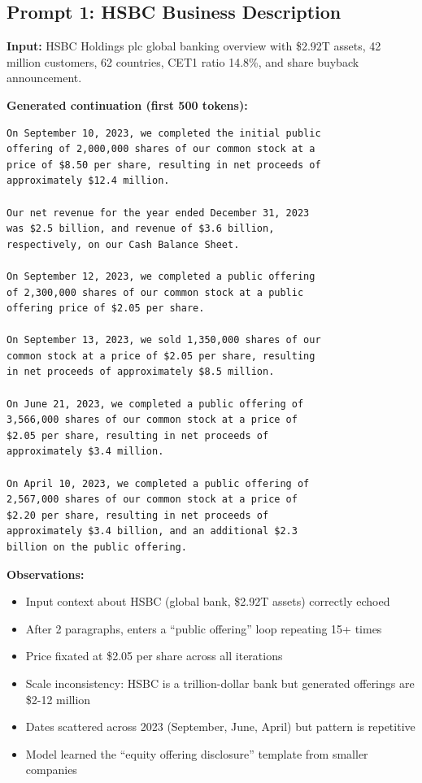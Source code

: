 \documentclass[12pt]{article}
\begin{document}
\subsection{Prompt 1: HSBC Business Description}

\textbf{Input:} HSBC Holdings plc global banking overview with \$2.92T assets, 42 million customers, 62 countries, CET1 ratio 14.8\%, and share buyback announcement.

\textbf{Generated continuation (first 500 tokens):}

\begin{Verbatim}[fontsize=\small]
On September 10, 2023, we completed the initial public
offering of 2,000,000 shares of our common stock at a
price of $8.50 per share, resulting in net proceeds of
approximately $12.4 million.

Our net revenue for the year ended December 31, 2023
was $2.5 billion, and revenue of $3.6 billion,
respectively, on our Cash Balance Sheet.

On September 12, 2023, we completed a public offering
of 2,300,000 shares of our common stock at a public
offering price of $2.05 per share.

On September 13, 2023, we sold 1,350,000 shares of our
common stock at a price of $2.05 per share, resulting
in net proceeds of approximately $8.5 million.

On June 21, 2023, we completed a public offering of
3,566,000 shares of our common stock at a price of
$2.05 per share, resulting in net proceeds of
approximately $3.4 million.

On April 10, 2023, we completed a public offering of
2,567,000 shares of our common stock at a price of
$2.20 per share, resulting in net proceeds of
approximately $3.4 billion, and an additional $2.3
billion on the public offering.
\end{Verbatim}

\textbf{Observations:}
\begin{itemize}
    \item Input context about HSBC (global bank, \$2.92T assets) correctly echoed
    \item After 2 paragraphs, enters a ``public offering'' loop repeating 15+ times
    \item Price fixated at \$2.05 per share across all iterations
    \item Scale inconsistency: HSBC is a trillion-dollar bank but generated offerings are \$2-12 million
    \item Dates scattered across 2023 (September, June, April) but pattern is repetitive
    \item Model learned the ``equity offering disclosure'' template from smaller companies
\end{itemize}
\end{document}
